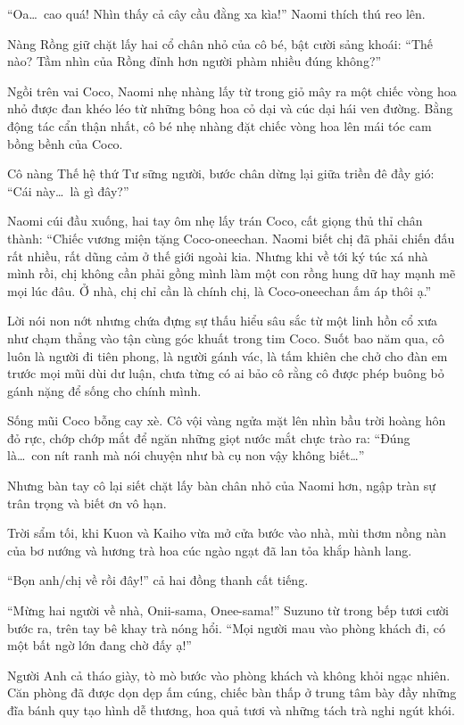 ﻿\documentclass[../main.tex]{subfiles}
\begin{document}
``Oa\dots\ cao quá! Nhìn thấy cả cây cầu đằng xa kìa!'' Naomi thích thú reo lên.

Nàng Rồng giữ chặt lấy hai cổ chân nhỏ của cô bé, bật cười sảng khoái: ``Thế nào? Tầm nhìn của Rồng đỉnh hơn người phàm nhiều đúng không?''

Ngồi trên vai Coco, Naomi nhẹ nhàng lấy từ trong giỏ mây ra một chiếc vòng hoa nhỏ được đan khéo léo từ những bông hoa cỏ dại và cúc dại hái ven đường. Bằng động tác cẩn thận nhất, cô bé nhẹ nhàng đặt chiếc vòng hoa lên mái tóc cam bồng bềnh của Coco.

Cô nàng Thế hệ thứ Tư sững người, bước chân dừng lại giữa triền đê đầy gió: ``Cái này\dots\ là gì đây?''

Naomi cúi đầu xuống, hai tay ôm nhẹ lấy trán Coco, cất giọng thủ thỉ chân thành: ``Chiếc vương miện tặng Coco-oneechan. Naomi biết chị đã phải chiến đấu rất nhiều, rất dũng cảm ở thế giới ngoài kia. Nhưng khi về tới ký túc xá nhà mình rồi, chị không cần phải gồng mình làm một con rồng hung dữ hay mạnh mẽ mọi lúc đâu. Ở nhà, chị chỉ cần là chính chị, là Coco-oneechan ấm áp thôi ạ.''

Lời nói non nớt nhưng chứa đựng sự thấu hiểu sâu sắc từ một linh hồn cổ xưa như chạm thẳng vào tận cùng góc khuất trong tim Coco. Suốt bao năm qua, cô luôn là người đi tiên phong, là người gánh vác, là tấm khiên che chở cho đàn em trước mọi mũi dùi dư luận, chưa từng có ai bảo cô rằng cô được phép buông bỏ gánh nặng để sống cho chính mình.

Sống mũi Coco bỗng cay xè. Cô vội vàng ngửa mặt lên nhìn bầu trời hoàng hôn đỏ rực, chớp chớp mắt để ngăn những giọt nước mắt chực trào ra: ``Đúng là\dots\ con nít ranh mà nói chuyện như bà cụ non vậy không biết\dots''

Nhưng bàn tay cô lại siết chặt lấy bàn chân nhỏ của Naomi hơn, ngập tràn sự trân trọng và biết ơn vô hạn.

\ct

Trời sẩm tối, khi Kuon và Kaiho vừa mở cửa bước vào nhà, mùi thơm nồng nàn của bơ nướng và hương trà hoa cúc ngào ngạt đã lan tỏa khắp hành lang.

``Bọn anh/chị về rồi đây!'' cả hai đồng thanh cất tiếng.

``Mừng hai người về nhà, Onii-sama, Onee-sama!'' Suzuno từ trong bếp tươi cười bước ra, trên tay bê khay trà nóng hổi. ``Mọi người mau vào phòng khách đi, có một bất ngờ lớn đang chờ đấy ạ!''

Người Anh cả tháo giày, tò mò bước vào phòng khách và không khỏi ngạc nhiên. Căn phòng đã được dọn dẹp ấm cúng, chiếc bàn thấp ở trung tâm bày đầy những đĩa bánh quy tạo hình dễ thương, hoa quả tươi và những tách trà nghi ngút khói.
\end{document}

